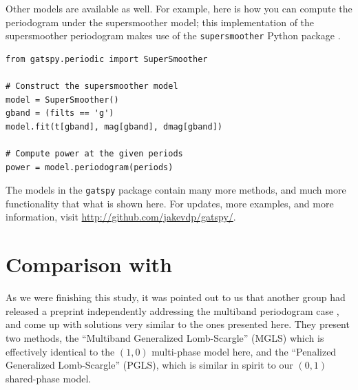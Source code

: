 \documentclass[12pt,preprint]{aastex}
\newcommand{\sectlabel}[1]{\label{sect:#1}}
\begin{document}
Other models are available as well. For example, here is how you can compute the periodogram under the supersmoother model; this implementation of the supersmoother periodogram makes use of the \texttt{supersmoother} Python package \citep{Vanderplas2015}.

\begin{lstlisting}
from gatspy.periodic import SuperSmoother

# Construct the supersmoother model
model = SuperSmoother()
gband = (filts == 'g')
model.fit(t[gband], mag[gband], dmag[gband])

# Compute power at the given periods
power = model.periodogram(periods)
\end{lstlisting}

The models in the \texttt{gatspy} package contain many more methods, and much more functionality that what is shown here. For updates, more examples, and more information, visit \url{http://github.com/jakevdp/gatspy/}.


\section{Comparison with \citet{Long2014}}
\sectlabel{long_comparison}
As we were finishing this study, it was pointed out to us that another group had released a preprint independently addressing the multiband periodogram case \citep[][hereafter LCB14]{Long2014}, and come up with solutions very similar to the ones presented here.
They present two methods, the ``Multiband Generalized Lomb-Scargle'' (MGLS) which is effectively identical to the $(1, 0)$ multi-phase model
here, and the ``Penalized Generalized Lomb-Scargle'' (PGLS), which is similar in spirit to our $(0, 1)$ shared-phase model.
\end{document}
